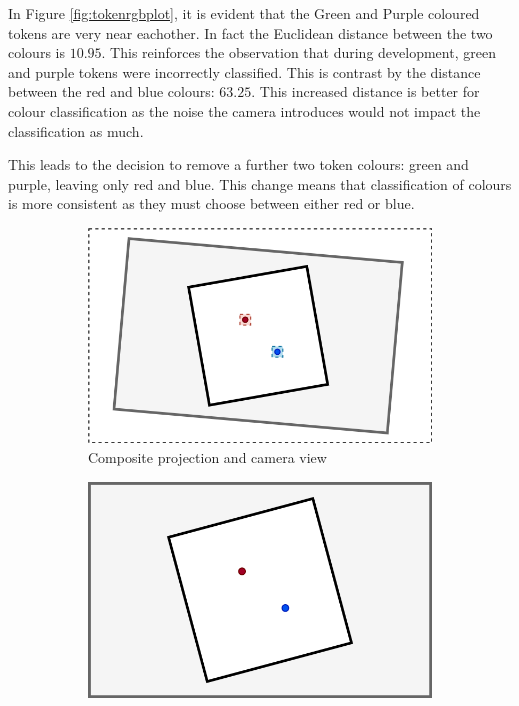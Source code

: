 \documentclass[12pt]{article}
\begin{document}
In Figure \ref{fig:tokenrgbplot}, it is evident that the Green and Purple coloured tokens are very near eachother.
In fact the Euclidean distance between the two colours is $10.95$. 
This reinforces the observation that during development, green and purple tokens were incorrectly classified. This is contrast by the distance between the red and blue colours: $63.25$.
This increased distance is better for colour classification as the noise the camera introduces would not impact the classification as much. 

This leads to the decision to remove a further two token colours: green and purple, leaving only red and blue. 
This change means that classification of colours is more consistent as they must choose between either red or blue.

\begin{figure}[H]
    \centering
    \begin{subfigure}{0.65\textwidth}
        \includegraphics[width=1\textwidth]{images/figures/fig15a}
        \caption{Composite projection and camera view}
        \label{fig:calibrationa}
    \end{subfigure}
    \begin{subfigure}{0.65\textwidth}
        \includegraphics[width=1\textwidth]{images/figures/fig15b}

\end{subfigure}
\end{figure}
\end{document}
